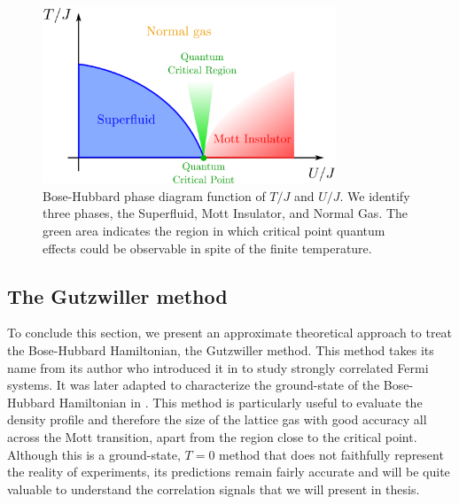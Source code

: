\begin{figure}
    \centering
    \includegraphics[width=0.78\textwidth]{Fig/Chapter2/phase_diagram.png}
    \caption[Bose-Hubbard phase diagram function of $T/J$ and $U/J$]{Bose-Hubbard phase diagram function of $T/J$ and $U/J$. We identify three phases, the Superfluid, Mott Insulator, and Normal Gas. The green area indicates the region in which critical point quantum effects could be observable in spite of the finite temperature.}
    \label{fig:phase_diagram}
\end{figure}



\subsection{The Gutzwiller method}

\label{sec:gutzwiller}

To conclude this section, we present an approximate theoretical approach to treat the Bose-Hubbard Hamiltonian, the Gutzwiller method. This method takes its name from its author who introduced it in \cite{gutzwiller1963effect} to study strongly correlated Fermi systems. It was later adapted to characterize the ground-state of the Bose-Hubbard Hamiltonian in \cite{rokhsar1991gutzwiller}. This method is particularly useful to evaluate the density profile and therefore the size of the lattice gas with good accuracy all across the Mott transition, apart from the region close to the critical point. Although this is a ground-state, $T=0$ method that does not faithfully represent the reality of experiments, its predictions remain fairly accurate and will be quite valuable to understand the correlation signals that we will present in thesis.

